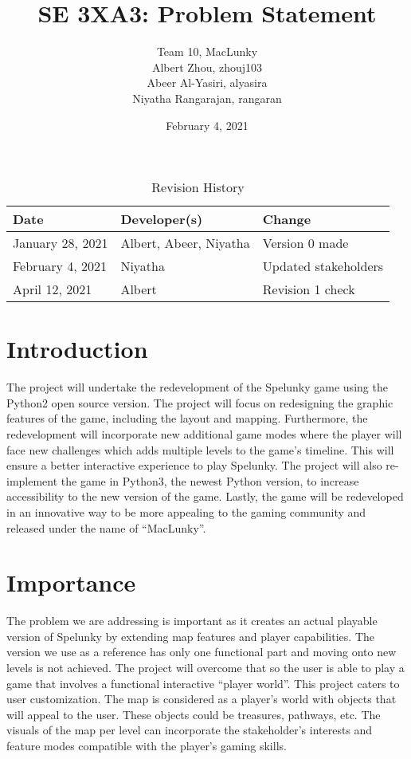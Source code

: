 \documentclass{article}
\title{SE 3XA3: Problem Statement}
\author{Team 10, MacLunky
		\\ Albert Zhou, zhouj103
		\\Abeer Al-Yasiri, alyasira
		\\ Niyatha Rangarajan, rangaran
}
\date{February 4, 2021}
\begin{document}
\begin{table}[hp]
\caption{Revision History} \label{TblRevisionHistory}
\begin{tabularx}{\textwidth}{llX}
\toprule
\textbf{Date} & \textbf{Developer(s)} & \textbf{Change}\\
\midrule
January 28, 2021 & Albert, Abeer, Niyatha & Version 0 made\\
\midrule
February 4, 2021 &  Niyatha & Updated stakeholders\\
\midrule
April 12, 2021 &  Albert & Revision 1 check\\
\bottomrule
\end{tabularx}
\end{table}

\newpage

\maketitle

\section{Introduction}
\indent \indent The project will undertake the redevelopment of the Spelunky game using the Python2 open source version. The project will focus on redesigning the graphic features of the game, including the layout and mapping. Furthermore, the redevelopment will incorporate new additional game modes where the player will face new challenges which adds multiple levels to the game’s timeline. This will ensure a better interactive experience to play Spelunky. The project will also re-implement the game in Python3, the newest Python version, to increase accessibility to the new version of the game. Lastly, the game will be redeveloped in an innovative way to be more appealing to the gaming community and released under the name of “MacLunky”. 

\section{Importance}
\indent \indent The problem we are addressing is important as it creates an actual playable version of Spelunky by extending map features and player capabilities. The version we use as a reference has only one functional part and moving onto new levels is not achieved. The project will overcome that so the user is able to play a game that involves a functional interactive “player world”.
This project caters to user customization. The map is considered as a player’s world with objects that will appeal to the user. These objects could be treasures, pathways, etc. The visuals of the map per level can incorporate the stakeholder’s interests and feature modes compatible with the player's gaming skills.
\end{document}
